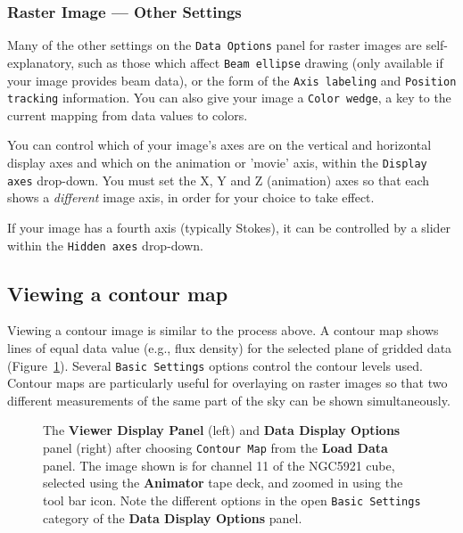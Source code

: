 \subsubsection{Raster Image --- Other Settings}
\label{section:display.image.raster.adjust.other}

Many of the other settings on the {\tt Data Options} panel for raster images
are self-explanatory, such as those which affect {\tt Beam ellipse} drawing
(only available if your image provides beam data), or the form of the
{\tt Axis labeling} and {\tt Position tracking} information.  You can also
give your image a {\tt Color wedge}, a key to the current mapping from data
values to colors.

You can control which of your image's axes are on the vertical and horizontal
display axes and which on the animation or 'movie' axis, within the
{\tt Display axes} drop-down.  You must set the X, Y and Z (animation) axes
so that each shows a {\it different} image axis, in order for your choice
to take effect.

If your image has a fourth axis (typically Stokes), it can be controlled
by a slider within the {\tt Hidden axes} drop-down.



\subsection{Viewing a contour map}
\label{section:display.image.contour}

Viewing a contour image is similar to the process above. A contour map
shows lines of equal data value (e.g., flux density) for the
selected plane of gridded data (Figure~\ref{fig:viewer_con}).
Several {\tt Basic Settings} options control the contour levels used.
Contour maps are particularly useful for overlaying on raster images so
that two different measurements of the same part of the sky can be shown
simultaneously.

 
\begin{figure}[h!]
\begin{center}
\caption{\label{fig:viewer_con} The {\bf Viewer Display Panel}
(left) and {\bf Data Display Options} panel (right) after choosing
{\tt Contour Map} from the {\bf Load Data} panel.  The
image shown is for channel 11 of the NGC5921 cube, selected using
the {\bf Animator} tape deck, and zoomed in using the tool bar icon.
Note the different options in the open {\tt Basic Settings} category
of the {\bf Data Display Options} panel.} 
\hrulefill
\end{center}
\end{figure}

